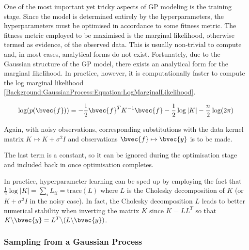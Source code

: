 				One of the most important yet tricky aspects of GP modeling is the training stage. Since the model is determined entirely by the hyperparameters, the hyperparameters must be optimised in accordance to some fitness metric. The fitness metric employed to be maximised is the marginal likelihood, otherwise termed as evidence, of the observed data. This is usually non-trivial to compute and, in most cases, analytical forms do not exist. Fortunately, due to the Gaussian structure of the GP model, there exists an analytical form for the marginal likelihood. In practice, however, it is computationally faster to compute the log marginal likelihood \eqref{Background:GaussianProcess:Equation:LogMarginalLikelihood}.
				
				\begin{equation}
					\log(p(\bvec{f})) = - \frac{1}{2} \bvec{f}^{T} K^{-1} \bvec{f} - \frac{1}{2} \log|K| - \frac{n}{2} \log(2 \pi)
				\label{Background:GaussianProcess:Equation:LogMarginalLikelihood}
				\end{equation}
				
				Again, with noisy observations, corresponding substitutions with the data kernel matrix $K \mapsto K + \sigma^{2} I$ and observations $\bvec{f} \mapsto \bvec{y}$ is to be made.
				
				The last term is a constant, so it can be ignored during the optimisation stage and included back in once optimisation completes.
				
				In practice, hyperparameter learning can be sped up by employing the fact that $\frac{1}{2} \log|K| = \sum_{i} L_{ii} = \mathrm{trace}(L)$ where $L$ is the Cholesky decomposition of $K$ (or $K + \sigma^{2} I$ in the noisy case). In fact, the Cholesky decomposition $L$ leads to better numerical stability when inverting the matrix $K$ since $K = LL^{T}$ so that $K \backslash \bvec{y} = L^{T} \backslash (L \backslash \bvec{y})$.
			
			\subsubsection{Sampling from a Gaussian Process}
			
